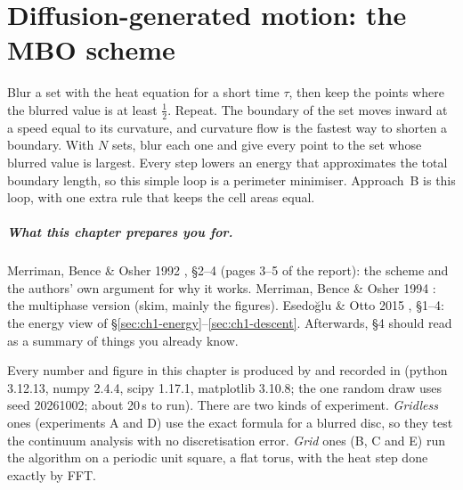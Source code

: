 
\chapter{Diffusion-generated motion: the MBO scheme}
\label{ch:mbo}

\begin{keyidea}
Blur a set with the heat equation for a short time $\tau$, then keep the points
where the blurred value is at least $\tfrac12$. Repeat. The boundary of the set
moves inward at a speed equal to its curvature, and curvature flow is the
fastest way to shorten a boundary. With $N$ sets, blur each one and give every
point to the set whose blurred value is largest. Every step lowers an energy
that approximates the total boundary length, so this simple loop is a
perimeter minimiser. Approach~B is this loop, with one extra rule that keeps
the cell areas equal.
\end{keyidea}

\paragraph{What this chapter prepares you for.}
Merriman, Bence \& Osher 1992 \cite{merriman1992diffusion}, \S2--4 (pages 3--5
of the report): the scheme and the authors' own argument for why it works.
Merriman, Bence \& Osher 1994 \cite{merriman1994motion}: the multiphase version
(skim, mainly the figures). Esedo\u{g}lu \& Otto 2015 \cite{esedoglu2015threshold},
\S1--4: the energy view of \S\ref{sec:ch1-energy}--\ref{sec:ch1-descent}.
Afterwards,  \S4 should read as a
summary of things you already know.

\begin{numbersbox}
Every number and figure in this chapter is produced by
 and recorded in
 (python 3.12.13, numpy 2.4.4, scipy 1.17.1,
matplotlib 3.10.8; the one random draw uses seed 20261002; about 20\,s to run).
There are two kinds of experiment. \emph{Gridless} ones (experiments A and D)
use the exact formula for a blurred disc, so they test the continuum analysis
with no discretisation error. \emph{Grid} ones (B, C and E) run the algorithm on
a periodic unit square, a flat torus, with the heat step done exactly by FFT.
\end{numbersbox}

